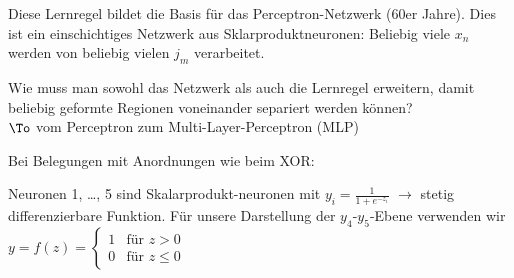 Diese Lernregel bildet die Basis für das Perceptron-Netzwerk (60er Jahre). Dies ist ein einschichtiges Netzwerk aus Sklarproduktneuronen: Beliebig viele $x_n$ werden von beliebig vielen $j_m$ verarbeitet.

Wie muss man sowohl das Netzwerk als auch die Lernregel erweitern, damit beliebig geformte Regionen voneinander separiert werden können?\\
$\To$ vom Perceptron zum Multi-Layer-Perceptron (MLP)\bigskip

Bei Belegungen mit Anordnungen wie beim XOR:
\begin{center}
\end{center}
Neuronen 1, …, 5 sind Skalarprodukt-neuronen mit $y_i = \frac{1}{1+e^{-z_i}}$ $\to$ stetig differenzierbare Funktion. Für unsere Darstellung der $y_4$-$y_5$-Ebene verwenden wir $y=f(z) = \begin{cases}
1 & \text{für } z> 0\\
0 & \text{für }z \leq 0
\end{cases}$

